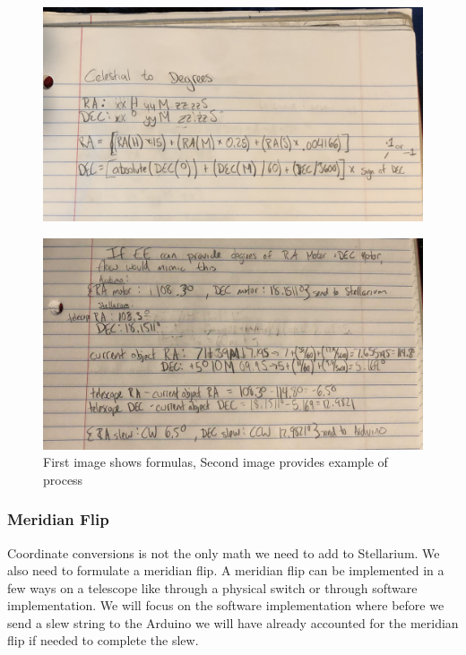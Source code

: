 \documentclass[12pt]{report}
\begin{document}
\begin{enumerate}
\begin{figure}[h]
  \centering
  \includegraphics[width=\linewidth]{convMath}
  \label{fig:convMath}
\end{figure}
\begin{figure}[h]
  \centering
  \includegraphics[width=\linewidth]{convExample}
  \caption{First image shows formulas, Second image provides example of process}
  \label{fig:convExample}
\end{figure}

\subsubsection*{Meridian Flip}

Coordinate conversions is not the only math we need to add to Stellarium. We also need to formulate a meridian flip. A meridian flip can be implemented in a few ways on a telescope like through a physical switch or through software implementation. We will focus on the software implementation where before we send a slew string to the Arduino we will have already accounted for the meridian flip if needed to complete the slew.


\end{enumerate}
\end{document}
